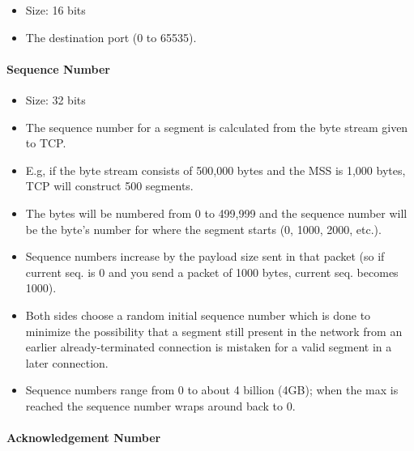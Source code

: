\documentclass{article}
\begin{document}
\begin{itemize}
    \item Size: 16 bits
    \item The destination port (0 to 65535).
\end{itemize}

\paragraph{Sequence Number}

\begin{itemize}
    \item Size: 32 bits
    \item The sequence number for a segment is calculated from the byte stream given to TCP.
    \item E.g, if the byte stream consists of 500,000 bytes and the MSS is 1,000 bytes, TCP will construct 500 segments.
    \item The bytes will be numbered from 0 to 499,999 and the sequence number will be the byte's number for where the segment starts (0, 1000, 2000, etc.).
    \item Sequence numbers increase by the payload size sent in that packet (so if current seq. is 0 and you send a packet of 1000 bytes, current seq. becomes 1000).
    \item Both sides choose a random initial sequence number which is done to minimize the possibility that a segment still present in the network from an earlier already-terminated connection is mistaken for a valid segment in a later connection.
    \item Sequence numbers range from 0 to about 4 billion (4GB); when the max is reached the sequence number wraps around back to 0.
\end{itemize}

\paragraph{Acknowledgement Number}
\end{document}
